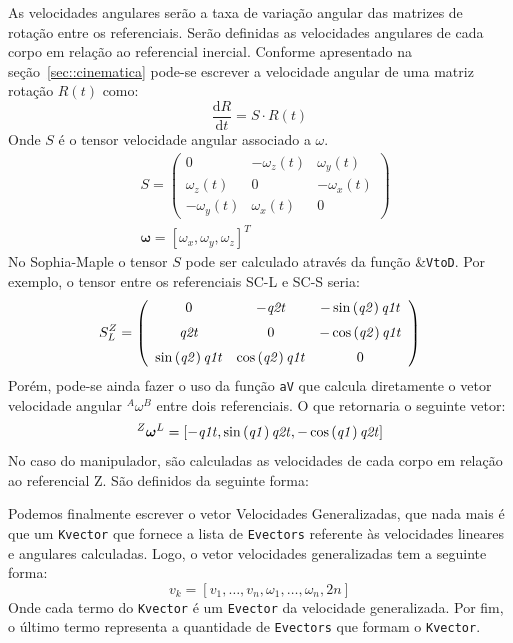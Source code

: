 As velocidades angulares serão a taxa de variação angular das matrizes de
rotação entre os referenciais. Serão definidas as velocidades angulares de cada
corpo em relação ao referencial inercial. Conforme apresentado na
seção~\ref{sec::cinematica} pode-se escrever a velocidade angular de uma matriz
rotação $R(t)$ como:
%
\begin{equation}
	\frac{\mathrm{d} R}{\mathrm{d} t} = S \cdot R(t)
\end{equation}
%
Onde $S$ é o tensor velocidade angular associado a $\omega$.
%
\begin{align}
& S = \begin{pmatrix}
0				& -\omega_{z}(t)	& \omega_{y}(t) \\ 
\omega_{z}(t)	& 0					& -\omega_{x}(t) \\ 
-\omega_{y}(t)	& \omega_{x}(t)		& 0
\end{pmatrix} \\
& \boldsymbol{\omega} = [\omega_{x}, \omega_{y}, \omega_{z}]^{T}
\end{align}
%
No Sophia-Maple o tensor $S$ pode ser calculado através da função
\&\texttt{VtoD}. Por exemplo, o tensor entre os referenciais SC-L e SC-S seria:
%
$$
S_{L}^{Z} = \left( \begin {array}{ccc} 0&-{\it q2t}&-\sin \left( {\it q2}
 \right) {\it q1t}\\ \noalign{\medskip}{\it q2t}&0&-\cos \left( {\it 
q2} \right) {\it q1t}\\ \noalign{\medskip}\sin \left( {\it q2}
 \right) {\it q1t}&\cos \left( {\it q2} \right) {\it q1t}&0
\end {array} \right)
$$
%
Porém, pode-se ainda fazer o uso da função \texttt{aV} que
calcula diretamente o vetor velocidade angular $^{A}\omega^{B}$ entre dois
referenciais. O que retornaria o seguinte vetor:
%
$$
^{Z}\boldsymbol{\omega}^{L} = [-{\it q1t},\sin \left( {\it q1} \right) {\it q2t},-\cos
\left( {\it q1} \right) {\it q2t}]
$$
%
No caso do manipulador, são calculadas as velocidades de cada corpo em relação
ao referencial Z. São definidos da seguinte forma:

\medskip {} \medskip 

Podemos finalmente escrever o vetor Velocidades Generalizadas, que nada mais é
que um \texttt{Kvector} que fornece a lista de \texttt{Evectors} referente às
velocidades lineares e angulares calculadas. Logo, o vetor velocidades
generalizadas tem a seguinte forma:
%
\begin{equation}
	v_{k} = [ v_{1},\ldots, v_{n}, \omega_{1},\ldots, \omega_{n}, 2n ]
\end{equation}
%
Onde cada termo do \texttt{Kvector} é um \texttt{Evector} da velocidade
generalizada.
Por fim, o último termo representa a quantidade de \texttt{Evectors} que formam o
\texttt{Kvector}.

